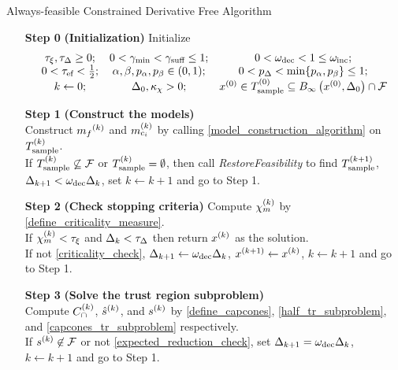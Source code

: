 \begin{algorithm}[H]
    \caption{Always-feasible Constrained Derivative Free Algorithm}	
    \label{constrained_dfo}
    \begin{itemize}
        \item[\textbf{Step 0}] \textbf{(Initialization)} Initialize
\begin{align*}
\begin{array}{ccc}
\tau_{\xi}, \tau_{\Delta} \ge 0; & 
0 < \gamma_{\textrm{min}} < \gamma_{\textrm{suff}} \le 1; & 
0 < \omega_{\text{dec}} < 1 \le \omega_{\text{inc}}; \\
0 < {\tau_{\textrm{ef}}} < \frac 1 2;  & 
\alpha, \beta, p_{\alpha}, p_{\beta} \in (0, 1); & 
0 < p_{\Delta} < \min\{p_{\alpha}, p_{\beta}\} \le 1;  \\
k \gets 0; &
\Delta_0, \kappa_{\chi} > 0; &
{x^{(0)}} \in T^{(0)}_{\textrm{sample}} \subseteq B_{\infty}\left({x^{(0)}}, \Delta_{0}\right) \cap {\mathcal F}
\end{array}
\end{align*}
        \item[\textbf{Step 1}] \textbf{(Construct the models)} \\
        Construct ${{m}_f}^{(k)}$ and ${{m}^{(k)}_{c_i}}$ by calling \cref{model_construction_algorithm} on ${T_{\text{sample}}^{(k)}}$. \\
        If ${T_{\text{sample}}^{(k)}} \not \subseteq {\mathcal F}$ or ${T_{\text{sample}}^{(k)}} = \emptyset$, then call \emph{RestoreFeasibility}  to find ${T_{\text{sample}}^{(k+1)}}$, $\Delta_{k+1}<\omega_{\text{dec}} \Delta_k$, set $k \gets k + 1$ and go to Step 1.
        
        \item[\textbf{Step 2}] \textbf{(Check stopping criteria)}
        	Compute ${\chi_m^{(k)}}$ by \cref{define_criticality_measure}. \\
			If $ {\chi_m^{(k)}} < \tau_{\xi} $ and $\Delta_k <\tau_{\Delta}$ then return $x^{(k)}$ as the solution. \\
			If not \cref{criticality_check},
                $\Delta_{k+1} \gets \omega_{\text{dec}}\Delta_k$, 
                $x^{(k+1)} \gets x^{(k)}$,
                $k \gets k+1$ and go to Step 1.
		
		
        \item[\textbf{Step 3}] \textbf{(Solve the trust region subproblem)} \\
        	Compute ${C^{(k)}_{\cap}}$, ${{\hat s}^{(k)}}$, and ${{s}^{(k)}}$ by
        	\cref{define_capcones}, \cref{half_tr_subproblem}, and \cref{capcones_tr_subproblem} respectively. \\
        	If ${{s}^{(k)}} \not \in {\mathcal F}$ or not \cref{expected_reduction_check}, set $\Delta_{k+1} = \omega_{\text{dec}}\Delta_k$, $k \gets k+1$ and go to Step 1.
		

\end{itemize}
\end{algorithm}
